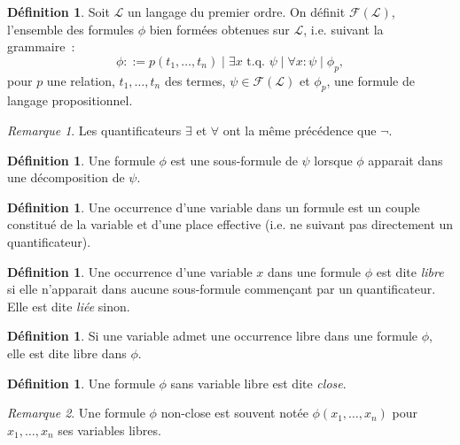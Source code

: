 \documentclass{article}
\theoremstyle{definition}
\newtheorem{déf}[thm]{Définition}
\theoremstyle{remark}
\newtheorem*{rmq}{Remarque}
\newcommand{\tq}{\text{ t.q. }}
\begin{document}
	\begin{déf} Soit $\mathcal L$ un langage du premier ordre. On définit $\mathcal F(\mathcal L)$, l'ensemble des formules $\phi$ bien formées
	obtenues sur $\mathcal L$, i.e. suivant la grammaire~:
	\[\phi ::= p(t_1, \ldots, t_n) \mid \exists x \tq \psi \mid \forall x : \psi \mid \phi_p,\]
	pour $p$ une relation, $t_1, \ldots, t_n$ des termes, $\psi \in \mathcal F(\mathcal L)$ et $\phi_p$, une formule de langage propositionnel.
	\end{déf}

	\begin{rmq} Les quantificateurs $\exists$ et $\forall$ ont la même précédence que $\lnot$.
	\end{rmq}

	\begin{déf} Une formule $\phi$ est une sous-formule de $\psi$ lorsque $\phi$ apparait dans une décomposition de $\psi$.
	\end{déf}

	\begin{déf} Une occurrence d'une variable dans un formule est un couple constitué de la variable et d'une place effective (i.e. ne suivant pas directement
	un quantificateur).
	\end{déf}

	\begin{déf} Une occurrence d'une variable $x$ dans une formule $\phi$ est dite \textit{libre} si elle n'apparait dans aucune sous-formule commençant par
	un quantificateur. Elle est dite \textit{liée} sinon.
	\end{déf}

	\begin{déf} Si une variable admet une occurrence libre dans une formule $\phi$, elle est dite libre dans $\phi$.
	\end{déf}

	\begin{déf} Une formule $\phi$ sans variable libre est dite \textit{close}.
	\end{déf}

	\begin{rmq} Une formule $\phi$ non-close est souvent notée $\phi(x_1, \ldots, x_n)$ pour $x_1, \ldots, x_n$ ses variables libres.
	\end{rmq}
\end{document}
